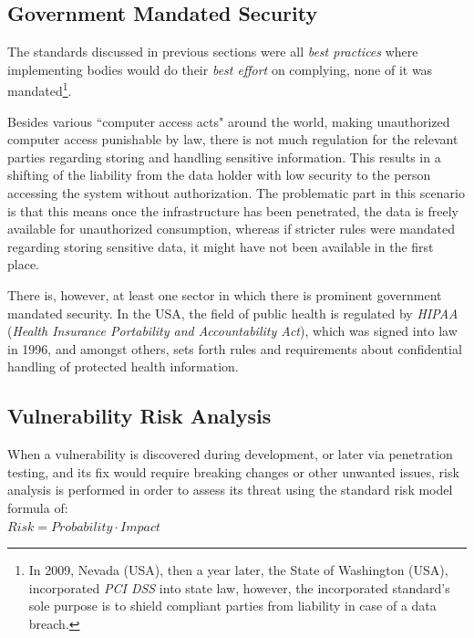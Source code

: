 \documentclass[a4paper,12pt]{article}
\begin{document}
\subsection{Government Mandated Security}
	
	The standards discussed in previous sections were all \textit{best practices} where implementing bodies would do their \textit{best effort} on complying, none of it was mandated\footnote{In 2009, Nevada (USA), then a year later, the State of Washington (USA), incorporated \textit{PCI DSS} into state law\cite{wash10}, however, the incorporated standard's sole purpose is to shield compliant parties from liability in case of a data breach.}.
	
	Besides various ``computer access acts" around the world, making unauthorized computer access punishable by law, there is not much regulation for the relevant parties regarding storing and handling sensitive information. This results in a shifting  of the liability from the data holder with low security to the person accessing the system without authorization. The problematic part in this scenario is that this means once the infrastructure has been penetrated, the data is freely available for unauthorized consumption, whereas if stricter rules were mandated regarding storing sensitive data, it might have not been available in the first place.
	
	There is, however, at least one sector in which there is prominent government mandated security. In the USA, the field of public health is regulated by \textit{HIPAA} (\textit{Health Insurance Portability and Accountability Act}), which was signed into law\cite{hipaa96} in 1996, and amongst others, sets forth rules and requirements about confidential handling of protected health information.
	
\newpage
\subsection{Vulnerability Risk Analysis} \label{ssec:vulnriskanal}

	When a vulnerability is discovered during development, or later via penetration testing, and its fix would require breaking changes or other unwanted issues, risk analysis is performed in order to assess its threat using the standard risk model formula of:
	\vspace{1.25em}\\
	$ Risk = Probability \cdot Impact $
	
\end{document}
